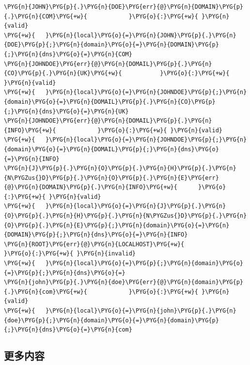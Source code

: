 \begin{codeblockbg}
\begin{Verbatim}[commandchars=\\\{\},breaklines=true,breakanywhere=true,fontsize=\codefont,xleftmargin=17bp]
\PYG{n}{JOHN}\PYG{p}{.}\PYG{n}{DOE}\PYG{err}{@}\PYG{n}{DOMAIN}\PYG{p}{.}\PYG{n}{COM}\PYG{+w}{            }\PYG{o}{:}\PYG{+w}{ }\PYG{n}{valid}
\PYG{+w}{   }\PYG{n}{local}\PYG{o}{=}\PYG{n}{JOHN}\PYG{p}{.}\PYG{n}{DOE}\PYG{p}{;}\PYG{n}{domain}\PYG{o}{=}\PYG{n}{DOMAIN}\PYG{p}{;}\PYG{n}{dns}\PYG{o}{=}\PYG{n}{COM}
\PYG{n}{JOHNDOE}\PYG{err}{@}\PYG{n}{DOMAIL}\PYG{p}{.}\PYG{n}{CO}\PYG{p}{.}\PYG{n}{UK}\PYG{+w}{           }\PYG{o}{:}\PYG{+w}{ }\PYG{n}{valid}
\PYG{+w}{   }\PYG{n}{local}\PYG{o}{=}\PYG{n}{JOHNDOE}\PYG{p}{;}\PYG{n}{domain}\PYG{o}{=}\PYG{n}{DOMAIL}\PYG{p}{.}\PYG{n}{CO}\PYG{p}{;}\PYG{n}{dns}\PYG{o}{=}\PYG{n}{UK}
\PYG{n}{JOHNDOE}\PYG{err}{@}\PYG{n}{DOMAIL}\PYG{p}{.}\PYG{n}{INFO}\PYG{+w}{            }\PYG{o}{:}\PYG{+w}{ }\PYG{n}{valid}
\PYG{+w}{   }\PYG{n}{local}\PYG{o}{=}\PYG{n}{JOHNDOE}\PYG{p}{;}\PYG{n}{domain}\PYG{o}{=}\PYG{n}{DOMAIL}\PYG{p}{;}\PYG{n}{dns}\PYG{o}{=}\PYG{n}{INFO}
\PYG{n}{J}\PYG{p}{.}\PYG{n}{O}\PYG{p}{.}\PYG{n}{H}\PYG{p}{.}\PYG{n}{N\PYGZus{}D}\PYG{p}{.}\PYG{n}{O}\PYG{p}{.}\PYG{n}{E}\PYG{err}{@}\PYG{n}{DOMAIN}\PYG{p}{.}\PYG{n}{INFO}\PYG{+w}{      }\PYG{o}{:}\PYG{+w}{ }\PYG{n}{valid}
\PYG{+w}{   }\PYG{n}{local}\PYG{o}{=}\PYG{n}{J}\PYG{p}{.}\PYG{n}{O}\PYG{p}{.}\PYG{n}{H}\PYG{p}{.}\PYG{n}{N\PYGZus{}D}\PYG{p}{.}\PYG{n}{O}\PYG{p}{.}\PYG{n}{E}\PYG{p}{;}\PYG{n}{domain}\PYG{o}{=}\PYG{n}{DOMAIN}\PYG{p}{;}\PYG{n}{dns}\PYG{o}{=}\PYG{n}{INFO}
\PYG{n}{ROOT}\PYG{err}{@}\PYG{n}{LOCALHOST}\PYG{+w}{                 }\PYG{o}{:}\PYG{+w}{ }\PYG{n}{invalid}
\PYG{+w}{   }\PYG{n}{local}\PYG{o}{=}\PYG{p}{;}\PYG{n}{domain}\PYG{o}{=}\PYG{p}{;}\PYG{n}{dns}\PYG{o}{=}
\PYG{n}{john}\PYG{p}{.}\PYG{n}{doe}\PYG{err}{@}\PYG{n}{domain}\PYG{p}{.}\PYG{n}{com}\PYG{+w}{            }\PYG{o}{:}\PYG{+w}{ }\PYG{n}{valid}
\PYG{+w}{   }\PYG{n}{local}\PYG{o}{=}\PYG{n}{john}\PYG{p}{.}\PYG{n}{doe}\PYG{p}{;}\PYG{n}{domain}\PYG{o}{=}\PYG{n}{domain}\PYG{p}{;}\PYG{n}{dns}\PYG{o}{=}\PYG{n}{com}
\end{Verbatim}
\end{codeblockbg}



\subsection{更多内容}



